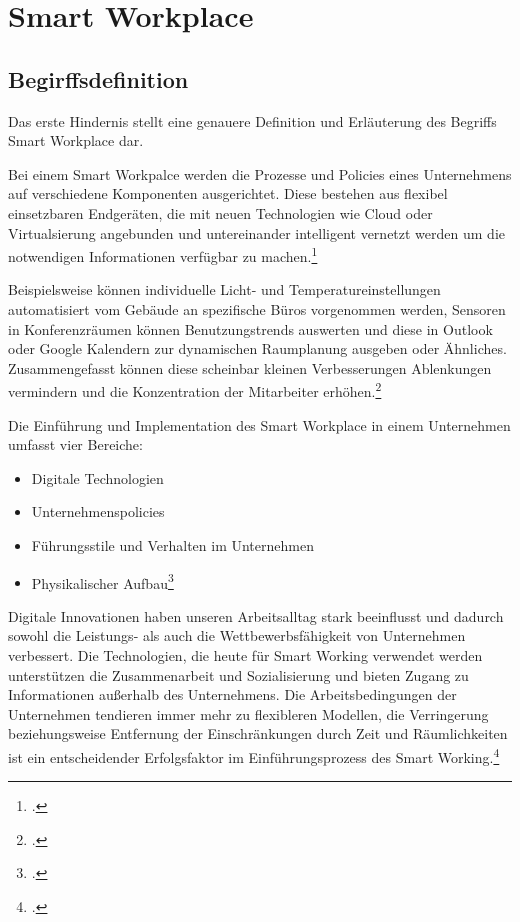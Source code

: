 \newpage
\section{Smart Workplace}
\subsection{Begirffsdefinition}
Das erste Hindernis stellt eine genauere Definition und Erläuterung des Begriffs Smart Workplace dar. 

Bei einem Smart Workpalce werden die Prozesse und Policies eines Unternehmens auf verschiedene Komponenten ausgerichtet. Diese bestehen aus flexibel einsetzbaren Endgeräten, die mit neuen Technologien wie Cloud oder Virtualsierung angebunden und untereinander intelligent vernetzt werden um die notwendigen Informationen verfügbar zu machen.\footcite[Vgl.][]{nextchange}

Beispielsweise können individuelle Licht- und Temperatureinstellungen automatisiert vom Gebäude an spezifische Büros vorgenommen werden, Sensoren in Konferenzräumen können Benutzungstrends auswerten und diese in Outlook oder Google Kalendern zur dynamischen Raumplanung ausgeben oder Ähnliches. Zusammengefasst können diese scheinbar kleinen Verbesserungen Ablenkungen vermindern und die Konzentration der Mitarbeiter erhöhen.\footcite[Vgl.][]{iotagenda}

Die Einführung und Implementation des Smart Workplace in einem Unternehmen umfasst vier Bereiche:

\begin{itemize}
\item[1.] Digitale Technologien
\item[2.] Unternehmenspolicies
\item[3.] Führungsstile und Verhalten im Unternehmen
\item[4.] Physikalischer Aufbau\footcite[Vgl.][]{efm}
\end{itemize}

Digitale Innovationen haben unseren Arbeitsalltag stark beeinflusst und dadurch sowohl die Leistungs- als auch die Wettbewerbsfähigkeit von Unternehmen verbessert. Die Technologien, die heute für Smart Working verwendet werden unterstützen die Zusammenarbeit und Sozialisierung und bieten Zugang zu Informationen außerhalb des Unternehmens. Die Arbeitsbedingungen der Unternehmen tendieren immer mehr zu flexibleren Modellen, die Verringerung beziehungsweise Entfernung der Einschränkungen durch Zeit und Räumlichkeiten ist ein entscheidender Erfolgsfaktor im Einführungsprozess des Smart Working.\footcite[Vgl.][]{efm}

